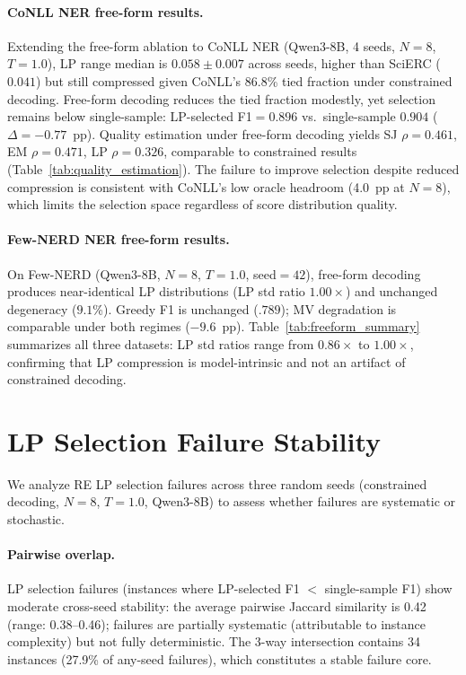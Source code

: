 \paragraph{CoNLL NER free-form results.}
Extending the free-form ablation to CoNLL NER (Qwen3-8B, 4 seeds, $N{=}8$, $T{=}1.0$), LP range median is $0.058{\pm}0.007$ across seeds, higher than SciERC ($0.041$) but still compressed given CoNLL's 86.8\% tied fraction under constrained decoding.
Free-form decoding reduces the tied fraction modestly, yet selection remains below single-sample: LP-selected F1${=}0.896$ vs.\ single-sample $0.904$ ($\Delta{=}{-}0.77$~pp).
Quality estimation under free-form decoding yields SJ $\rho{=}0.461$, EM $\rho{=}0.471$, LP $\rho{=}0.326$, comparable to constrained results (Table~\ref{tab:quality_estimation}).
The failure to improve selection despite reduced compression is consistent with CoNLL's low oracle headroom (4.0~pp at $N{=}8$), which limits the selection space regardless of score distribution quality.

\paragraph{Few-NERD NER free-form results.}
On Few-NERD (Qwen3-8B, $N{=}8$, $T{=}1.0$, seed${=}42$), free-form decoding produces near-identical LP distributions (LP std ratio $1.00{\times}$) and unchanged degeneracy ($9.1$\%).
Greedy F1 is unchanged ($.789$); MV degradation is comparable under both regimes ($-9.6$~pp).
Table~\ref{tab:freeform_summary} summarizes all three datasets: LP std ratios range from $0.86{\times}$ to $1.00{\times}$, confirming that LP compression is model-intrinsic and not an artifact of constrained decoding.

\section{LP Selection Failure Stability}\label{app:lp_failure_stability}

We analyze RE LP selection failures across three random seeds (constrained decoding, $N{=}8$, $T{=}1.0$, Qwen3-8B) to assess whether failures are systematic or stochastic.

\paragraph{Pairwise overlap.}
LP selection failures (instances where LP-selected F1 $<$ single-sample F1) show moderate cross-seed stability: the average pairwise Jaccard similarity is 0.42 (range: 0.38--0.46); failures are partially systematic (attributable to instance complexity) but not fully deterministic.
The 3-way intersection contains 34 instances (27.9\% of any-seed failures), which constitutes a stable failure core.

